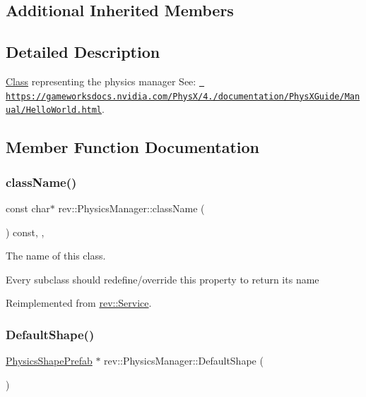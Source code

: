 \subsection*{Additional Inherited Members}


\subsection{Detailed Description}
\mbox{\hyperlink{struct_class}{Class}} representing the physics manager See\+: \href{https://gameworksdocs.nvidia.com/PhysX/4.0/documentation/PhysXGuide/Manual/HelloWorld.html}{\texttt{ https\+://gameworksdocs.\+nvidia.\+com/\+Phys\+X/4./documentation/\+Phys\+X\+Guide/\+Manual/\+Hello\+World.\+html}}. 

\subsection{Member Function Documentation}
\mbox{\label{classrev_1_1_physics_manager_a557872ba7a7c0fb2074b408f185aa789}} 
\subsubsection{\texorpdfstring{className()}{className()}}
{\footnotesize\ttfamily const char$\ast$ rev\+::\+Physics\+Manager\+::class\+Name (\begin{DoxyParamCaption}{ }\end{DoxyParamCaption}) const\hspace{0.3cm}{\ttfamily [inline]}, {\ttfamily [override]}, {\ttfamily [virtual]}}



The name of this class. 

Every subclass should redefine/override this property to return its name 

Reimplemented from \mbox{\hyperlink{classrev_1_1_service_a484d71757ea6e8780488602cb421a4a5}{rev\+::\+Service}}.

\mbox{\label{classrev_1_1_physics_manager_ab57f5c4ff1ac9039a876ae1d2ce26978}} 
\subsubsection{\texorpdfstring{DefaultShape()}{DefaultShape()}}
{\footnotesize\ttfamily \mbox{\hyperlink{classrev_1_1_physics_shape_prefab}{Physics\+Shape\+Prefab}} $\ast$ rev\+::\+Physics\+Manager\+::\+Default\+Shape (\begin{DoxyParamCaption}{ }\end{DoxyParamCaption})\hspace{0.3cm}{\ttfamily [static]}}




